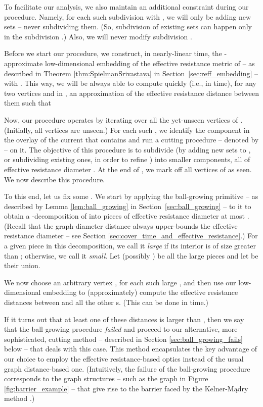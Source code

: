 \documentclass[11pt, letterpaper]{article}
\begin{document}
To facilitate our analysis, we also maintain an additional constraint during our procedure. Namely, for each such subdivision  with , we will only be adding new sets -- never subdividing them. (So, subdivision of existing sets can happen only in the subdivision .) Also, we will never modify subdivision .

Before we start our procedure, we construct, in nearly-linear time, the -approximate low-dimensional embedding  of the effective resistance metric of  -- as described in Theorem \ref{thm:SpielmanSrivastava} in Section~\ref{sec:reff_embedding} -- with . This way, we will be always able to compute quickly (i.e., in  time), for any two vertices  and  in , an approximation  of the effective resistance distance  between them such that




Now, our procedure operates by iterating over all the yet-unseen vertices  of . (Initially, all vertices are unseen.) For each such , we identify the component  in the overlay  of the current  that contains  and run a cutting procedure -- denoted by  -- on it. The objective of this procedure is to subdivide  (by adding new sets to , or subdividing existing ones, in order to refine ) into smaller components, all of effective resistance diameter . At the end of , we mark off all vertices of  as seen. We now describe this procedure.


To this end, let us fix some . We start by applying the ball-growing primitive -- as described by Lemma \ref{lem:ball_growing} in  Section~\ref{sec:ball_growing} -- to it to obtain a -decomposition of  into pieces of effective resistance diameter at most . (Recall that the graph-diameter distance always upper-bounds the effective resistance diameter -- see Section \ref{sec:cover_time_and_effective_resistance}.) For a given piece  in this decomposition, we call it {\em large} if its interior  is of size greater than ; otherwise,  we call it \emph{small}. Let  (possibly ) be all the large pieces and let  be their union. 

We now choose an arbitrary vertex , for each such large , and then use our low-dimensional embedding  to (approximately) compute the effective resistance distances between  and all the other s. (This can be done in  time.) 

If it turns out that at least one of these distances is larger than , then we say that the ball-growing procedure {\em failed} and proceed to our alternative, more sophisticated, cutting method -- described in Section \ref{sec:ball_growing_fails} below -- that deals with this case. This method encapsulates the key advantage of our choice to employ the effective resistance-based optics instead of the usual graph distance-based one. (Intuitively, the failure of the ball-growing procedure corresponds to the graph structures -- such as the graph in Figure \ref{fig:barrier_example} -- that give rise to the  barrier faced by the Kelner-Mądry method \cite{KelnerM09}.)
\end{document}
